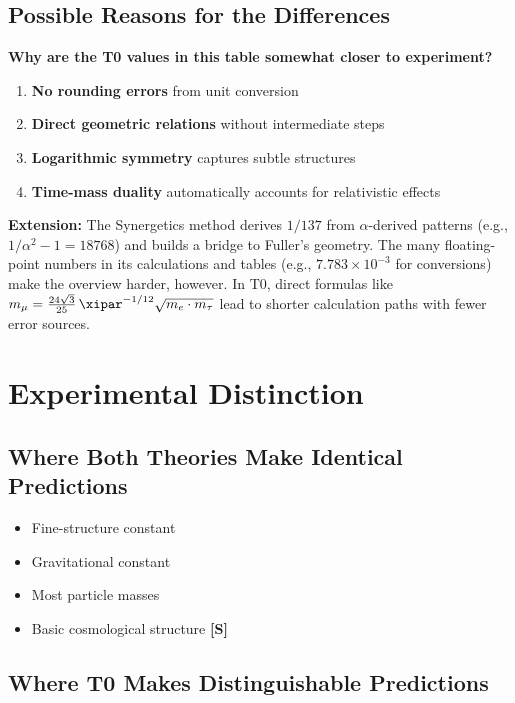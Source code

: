 	
	
	\subsection{Possible Reasons for the Differences}
	
	\textbf{Why are the T0 values in this table somewhat closer to experiment?}
	
	\begin{enumerate}
		\item \textbf{No rounding errors} from unit conversion
		\item \textbf{Direct geometric relations} without intermediate steps
		\item \textbf{Logarithmic symmetry} captures subtle structures
		\item \textbf{Time-mass duality} automatically accounts for relativistic effects
	\end{enumerate}
	
	\textbf{Extension:} The Synergetics method derives $1/137$ from $\alpha$-derived patterns (e.g., $1/\alpha^2 - 1 = 18768$) and builds a bridge to Fuller's geometry. The many floating-point numbers in its calculations and tables (e.g., $7.783 \times 10^{-3}$ for conversions) make the overview harder, however. In T0, direct formulas like $m_\mu = \frac{24\sqrt3}{25}\,\xipar^{-1/12}\sqrt{m_e \cdot m_\tau}$ lead to shorter calculation paths with fewer error sources.
	
	\section{Experimental Distinction}
	
	\subsection{Where Both Theories Make Identical Predictions}
	
	\begin{itemize}
		\item Fine-structure constant
		\item Gravitational constant
		\item Most particle masses
		\item Basic cosmological structure \textbf{[S]}
	\end{itemize}
	
	\subsection{Where T0 Makes Distinguishable Predictions}
	
